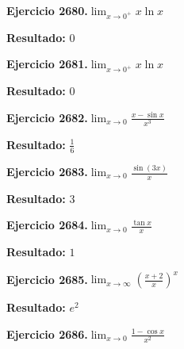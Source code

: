 \documentclass[10pt,a4paper]{article}
\begin{document}
\begin{ejbox}
\textbf{Ejercicio 2680.}\quad $\lim_{x\to 0^+} x\ln x$
\end{ejbox}

\begin{solbox}
\textbf{Resultado:} \(\displaystyle 0\)
\end{solbox}

\begin{ejbox}
\textbf{Ejercicio 2681.}\quad $\lim_{x\to 0^+} x\ln x$
\end{ejbox}

\begin{solbox}
\textbf{Resultado:} \(\displaystyle 0\)
\end{solbox}

\newpage
\begin{ejbox}
\textbf{Ejercicio 2682.}\quad $\lim_{x\to 0} \frac{x-\sin x}{x^3}$
\end{ejbox}

\begin{solbox}
\textbf{Resultado:} \(\displaystyle \frac{1}{6}\)
\end{solbox}

\begin{ejbox}
\textbf{Ejercicio 2683.}\quad $\lim_{x\to 0} \frac{\sin(3x)}{x}$
\end{ejbox}

\begin{solbox}
\textbf{Resultado:} \(\displaystyle 3\)
\end{solbox}

\begin{ejbox}
\textbf{Ejercicio 2684.}\quad $\lim_{x\to 0} \frac{\tan x}{x}$
\end{ejbox}

\begin{solbox}
\textbf{Resultado:} \(\displaystyle 1\)
\end{solbox}

\newpage
\begin{ejbox}
\textbf{Ejercicio 2685.}\quad $\lim_{x\to \infty} \left(\frac{x+2}{x}\right)^{x}$
\end{ejbox}

\begin{solbox}
\textbf{Resultado:} \(\displaystyle e^{2}\)
\end{solbox}

\begin{ejbox}
\textbf{Ejercicio 2686.}\quad $\lim_{x\to 0} \frac{1-\cos x}{x^2}$
\end{ejbox}
\end{document}
